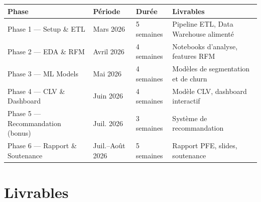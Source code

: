 \documentclass[11pt,a4paper]{article}
\begin{document}
\begin{center}
\small
\begin{tabularx}{\textwidth}{X p{2.8cm} p{2cm} X}
\toprule
\rowcolor{primary}
\color{white}\bfseries Phase & \color{white}\bfseries Période & \color{white}\bfseries Durée & \color{white}\bfseries Livrables \\
\midrule
Phase 1 --- Setup \& ETL          & Mars 2026       & 5 semaines & Pipeline ETL, Data Warehouse alimenté \\
\rowcolor{lightbg}
Phase 2 --- EDA \& RFM            & Avril 2026      & 4 semaines & Notebooks d'analyse, features RFM \\
Phase 3 --- ML Models             & Mai 2026        & 4 semaines & Modèles de segmentation et de churn \\
\rowcolor{lightbg}
Phase 4 --- CLV \& Dashboard      & Juin 2026       & 4 semaines & Modèle CLV, dashboard interactif \\
Phase 5 --- Recommandation (bonus) & Juil. 2026     & 3 semaines & Système de recommandation \\
\rowcolor{lightbg}
Phase 6 --- Rapport \& Soutenance & Juil.--Août 2026 & 5 semaines & Rapport PFE, slides, soutenance \\
\bottomrule
\end{tabularx}
\end{center}

\section{Livrables}
\end{document}
